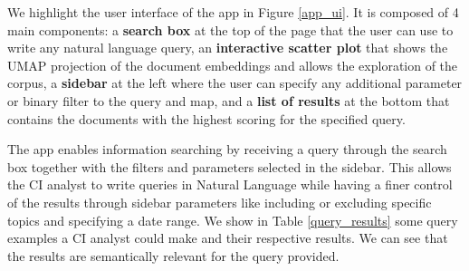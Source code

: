 \documentclass[a4paper]{article}
\begin{document}
We highlight the user interface of the app in Figure \ref{app_ui}. It is composed of 4 main components: a \textbf{search box} at the top of the page that the user can use to write any natural language query, an \textbf{interactive scatter plot} that shows the UMAP projection of the document embeddings and allows the exploration of the corpus, a \textbf{sidebar} at the left where the user can specify any additional parameter or binary filter to the query and map, and a \textbf{list of results} at the bottom that contains the documents with the highest scoring for the specified query.

The app enables information searching by receiving a query through the search box together with the filters and parameters selected in the sidebar. This allows the CI analyst to write queries in Natural Language while having a finer control of the results through sidebar parameters like including or excluding specific topics and specifying a date range. We show in Table \ref{query_results} some query examples a CI analyst could make and their respective results. We can see that the results are semantically relevant for the query provided.
\end{document}
